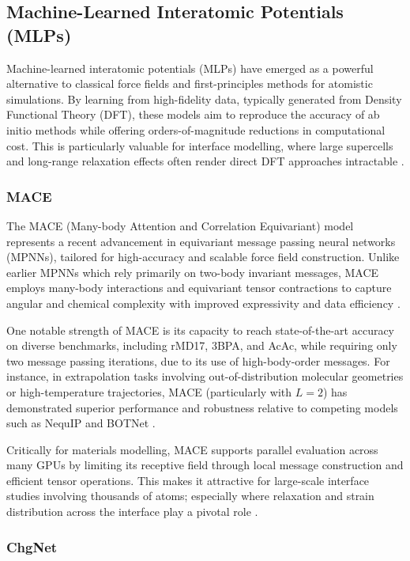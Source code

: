 \subsection{Machine-Learned Interatomic Potentials (MLPs)}

Machine-learned interatomic potentials (MLPs) have emerged as a powerful alternative to classical force fields and first-principles methods for atomistic simulations. By learning from high-fidelity data, typically generated from Density Functional Theory (DFT), these models aim to reproduce the accuracy of ab initio methods while offering orders-of-magnitude reductions in computational cost. This is particularly valuable for interface modelling, where large supercells and long-range relaxation effects often render direct DFT approaches intractable .

\subsubsection{MACE}

The MACE (Many-body Attention and Correlation Equivariant) model represents a recent advancement in equivariant message passing neural networks (MPNNs), tailored for high-accuracy and scalable force field construction. Unlike earlier MPNNs which rely primarily on two-body invariant messages, MACE employs many-body interactions and equivariant tensor contractions to capture angular and chemical complexity with improved expressivity and data efficiency .

One notable strength of MACE is its capacity to reach state-of-the-art accuracy on diverse benchmarks, including rMD17, 3BPA, and AcAc, while requiring only two message passing iterations, due to its use of high-body-order messages. For instance, in extrapolation tasks involving out-of-distribution molecular geometries or high-temperature trajectories, MACE (particularly with $L=2$) has demonstrated superior performance and robustness relative to competing models such as NequIP and BOTNet .

Critically for materials modelling, MACE supports parallel evaluation across many GPUs by limiting its receptive field through local message construction and efficient tensor operations. This makes it attractive for large-scale interface studies involving thousands of atoms; especially where relaxation and strain distribution across the interface play a pivotal role .

\subsubsection{ChgNet}

